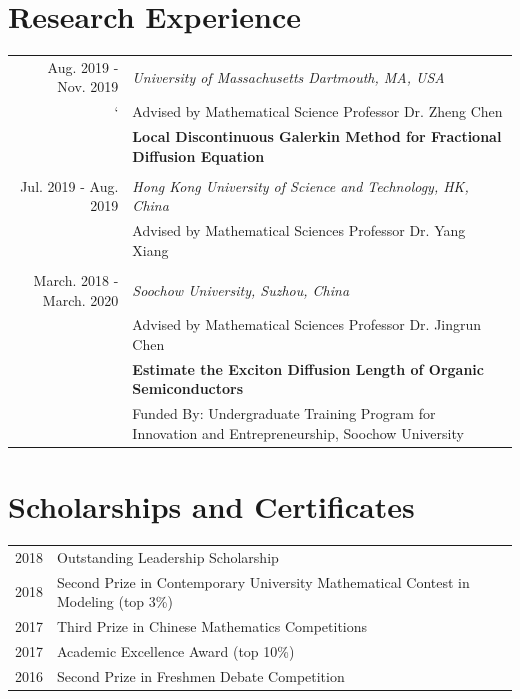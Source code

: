 \documentclass[a4paper,10pt,utf8]{article} %
\begin{document}
\section{Research Experience}
\begin{tabular}{r|p{11cm}}	
	Aug. 2019 - Nov. 2019 					& \textit{University of Massachusetts Dartmouth, MA, USA}\\
	`					&Advised by Mathematical Science Professor Dr. Zheng Chen\\   
	& \textbf{Local Discontinuous Galerkin Method for Fractional Diffusion Equation }\\
	
	\multicolumn{2}{c}{} \\	%
	
	Jul. 2019 - Aug. 2019  					& \textit{Hong Kong University of Science and Technology, HK, China}\\
	& Advised by Mathematical Sciences Professor Dr. Yang Xiang     \\
	
	\multicolumn{2}{c}{} \\
	
	 March. 2018 - March. 2020 						& \textit{Soochow University, Suzhou, China}\\ 
	 & Advised by Mathematical Sciences Professor Dr. Jingrun Chen\\
	 & \textbf{Estimate the Exciton Diffusion Length of Organic Semiconductors}\\
	 &  Funded By: Undergraduate Training Program for Innovation and Entrepreneurship, Soochow University \\
\end{tabular}

\section{Scholarships and Certificates}

\begin{tabular}{r|l}
2018 		& Outstanding Leadership Scholarship \\
2018		& Second Prize in Contemporary University Mathematical Contest in Modeling (top 3\%)\\
2017		& Third Prize in Chinese Mathematics Competitions\\
2017		& Academic Excellence Award (top 10\%) \\
2016		& Second Prize in Freshmen Debate Competition\\
\end{tabular}
\end{document}
